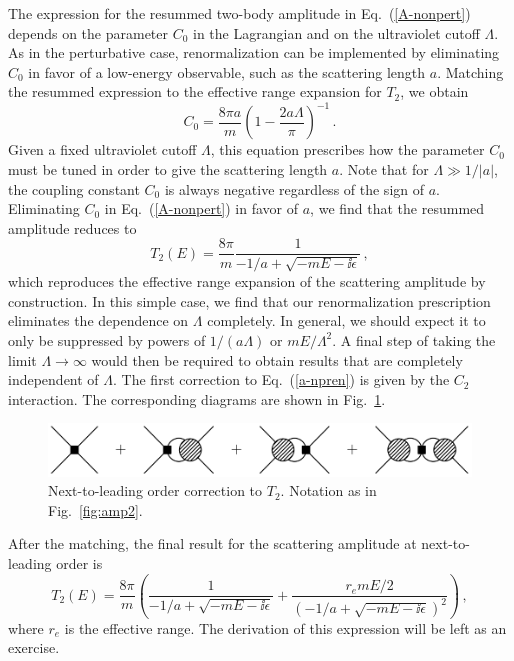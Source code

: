 The expression for the resummed two-body
amplitude in Eq.~(\ref{A-nonpert}) depends on the
parameter $C_0$ in the Lagrangian and
on the ultraviolet cutoff $\Lambda$. As in the perturbative case,
renormalization can be implemented
by eliminating $C_0$ in favor of a low-energy observable, such as the
scattering length $a$. 
Matching the resummed expression to the effective range expansion
for $T_2$, we obtain
\begin{equation}
 C_0 = \frac{8\pi a}{m} \left( 1 - \frac{2 a \Lambda}{\pi} \right)^{-1}  \,.
\label{g2-tune}
\end{equation}
Given a fixed ultraviolet cutoff $\Lambda$, this equation prescribes how
the parameter $C_0$ must be tuned in order to give the 
scattering length $a$.  Note that for $\Lambda \gg 1/|a|$,
the coupling constant $C_0$ is always negative 
regardless of the sign of $a$.
Eliminating $C_0$ in Eq.~(\ref{A-nonpert}) in favor of $a$, 
we find that the resummed amplitude reduces to
\begin{equation}
 T_2 (E) = \frac{8\pi}{m}\frac1{{-}1/a + \sqrt {{-}mE -\ii \epsilon}} \,,
\label{a-npren}
\end{equation}
which reproduces the effective range expansion of the scattering
amplitude by construction. 
In this simple case, we find that our renormalization prescription 
eliminates the dependence on $\Lambda$ completely. In general, 
we should expect it to only be suppressed by powers of
$1/(a \Lambda)$ or $mE/ \Lambda^2$.  A final step of taking the limit 
$\Lambda \to \infty$ would then be required to obtain results 
that are completely independent of  $\Lambda$.
The first correction to Eq.~(\ref{a-npren}) is given by the
$C_2$ interaction. The corresponding diagrams are shown in
Fig.~\ref{fig:amp2c}.
\begin{figure}[htb]
\bigskip
\centerline{\includegraphics*[width=12cm,angle=0]{fig_feynC2int.pdf}}
\medskip
\caption
    {Next-to-leading order correction to $T_2$.
      Notation as in Fig.~\ref{fig:amp2}.}
\label{fig:amp2c}
\end{figure}
After the matching, the final result for the scattering amplitude
at next-to-leading order is
\begin{equation}
 T_2 (E) = \frac{8\pi}{m}\left(
 \frac1{{-}1/a + \sqrt {{-}mE -\ii\epsilon}}
 + \frac{r_e mE/2}{({-}1/a + \sqrt {-mE - \ii \epsilon})^2}\right) \,,
\label{a-npren2}
\end{equation}
where $r_e$ is the effective range. 
The derivation of this expression will be left as an exercise.

